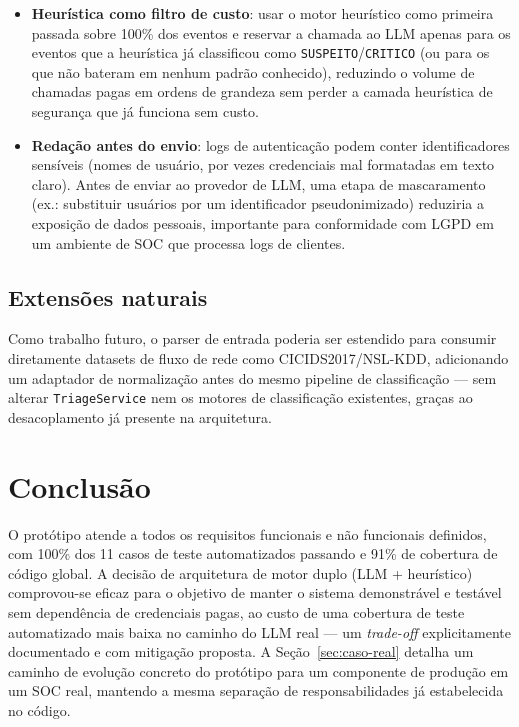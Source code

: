 \documentclass[11pt,a4paper]{article}
\begin{document}
\begin{itemize}[nosep]
  \item \textbf{Heurística como filtro de custo}: usar o motor heurístico como
  primeira passada sobre 100\% dos eventos e reservar a chamada ao LLM apenas para os
  eventos que a heurística já classificou como \texttt{SUSPEITO}/\texttt{CRITICO} (ou
  para os que não bateram em nenhum padrão conhecido), reduzindo o volume de chamadas
  pagas em ordens de grandeza sem perder a camada heurística de segurança que já
  funciona sem custo.
  \item \textbf{Redação antes do envio}: logs de autenticação podem conter
  identificadores sensíveis (nomes de usuário, por vezes credenciais mal formatadas em
  texto claro). Antes de enviar ao provedor de LLM, uma etapa de mascaramento
  (ex.: substituir usuários por um identificador pseudonimizado) reduziria a exposição
  de dados pessoais, importante para conformidade com LGPD em um ambiente de SOC que
  processa logs de clientes.
\end{itemize}

\subsection{Extensões naturais}

Como trabalho futuro, o parser de entrada poderia ser estendido para consumir
diretamente datasets de fluxo de rede como CICIDS2017/NSL-KDD, adicionando um adaptador
de normalização antes do mesmo pipeline de classificação --- sem alterar \texttt{TriageService} nem os motores
de classificação existentes, graças ao desacoplamento já presente na arquitetura.

\section{Conclusão}

O protótipo atende a todos os requisitos funcionais e não funcionais definidos, com
100\% dos 11 casos de teste automatizados passando e 91\% de cobertura de código
global. A decisão de arquitetura de motor duplo (LLM + heurístico) comprovou-se
eficaz para o objetivo de manter o sistema demonstrável e testável sem dependência de
credenciais pagas, ao custo de uma cobertura de teste automatizado mais baixa no
caminho do LLM real --- um \emph{trade-off} explicitamente documentado e com mitigação
proposta. A Seção~\ref{sec:caso-real} detalha um caminho de evolução concreto do
protótipo para um componente de produção em um SOC real, mantendo a mesma separação de
responsabilidades já estabelecida no código.
\end{document}
